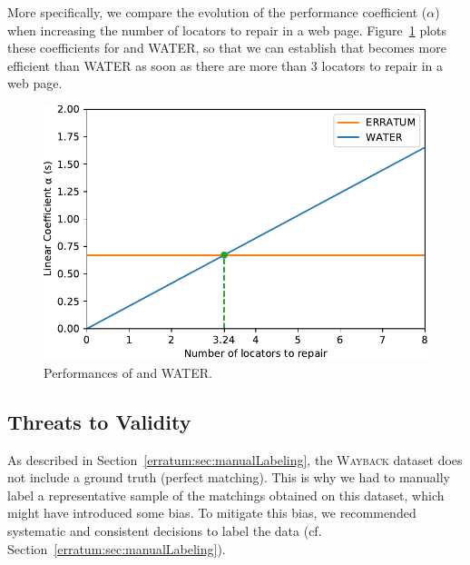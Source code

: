 More specifically, we compare the evolution of the performance coefficient ($\alpha$) when increasing the number of locators to repair in a web page.
Figure~\ref{fig:comparisonLinearCoefficients} plots these coefficients for \erratum and WATER, so that we can establish that \erratum{} becomes more efficient than WATER as soon as there are more than 3 locators to repair in a web page.

\begin{figure}[]
  \centering
  \includegraphics[width=.75\linewidth]{erratum/linearRegression}
  \caption{Performances of \erratum and WATER.}
  \label{fig:comparisonLinearCoefficients}
\end{figure}





\subsection{Threats to Validity}\label{erratum:sec:threats}
As described in Section~\ref{erratum:sec:manualLabeling}, the \textsc{Wayback} dataset does not include a ground truth (perfect matching).
This is why we had to manually label a representative sample of the matchings obtained on this dataset, which might have introduced some bias.
To mitigate this bias, we recommended systematic and consistent decisions to label the data (cf. Section~\ref{erratum:sec:manualLabeling}). 


